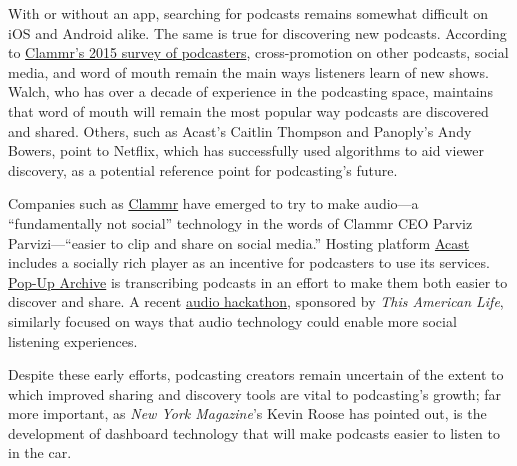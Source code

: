 \documentclass[notoc, symmetric, nobib, nols]{towcenter-guideto-book}
\begin{document}
With or without an app, searching for podcasts remains somewhat difficult on iOS and Android alike. The same is true for discovering new podcasts. According to \href{http://www.slideshare.net/clammrapp/20150617-future-of-podcasting-2015-clammr-v-f}{Clammr's 2015 survey of podcasters}, cross-promotion on other podcasts, social media, and word of mouth remain the main ways listeners learn of new shows.\autocite{clammrfuture} Walch, who has over a decade of experience in the podcasting space, maintains that word of mouth will remain the most popular way podcasts are discovered and shared.\autocite{Walch} Others, such as Acast's Caitlin Thompson and Panoply's Andy Bowers, point to Netflix, which has successfully used algorithms to aid viewer discovery, as a potential reference point for podcasting's future.\autocite{thompson} \autocite{bowers}

Companies such as \href{http://www.clammr.com/}{Clammr} have emerged to try to make audio---a ``fundamentally not social'' technology in the words of Clammr CEO Parviz Parvizi---``easier to clip and share on social media.''\autocite{parvizi} Hosting platform \href{http://www.acast.com/}{Acast} includes a socially rich player as an incentive for podcasters to use its services. \href{https://www.popuparchive.com}{Pop-Up Archive} is transcribing podcasts in an effort to make them both easier to discover and share. A recent \href{http://audiohackathon.com/}{audio hackathon}, sponsored by \textit{This American Life}, similarly focused on ways that audio technology could enable more social listening experiences.\autocite{hotpodhackathon} 

Despite these early efforts, podcasting creators remain uncertain of the extent to which improved sharing and discovery tools are vital to podcasting's growth; far more important, as \textit{New York Magazine}'s Kevin Roose has pointed out, is the development of dashboard technology that will make podcasts easier to listen to in the car.\autocite{PCcars} 
\end{document}
